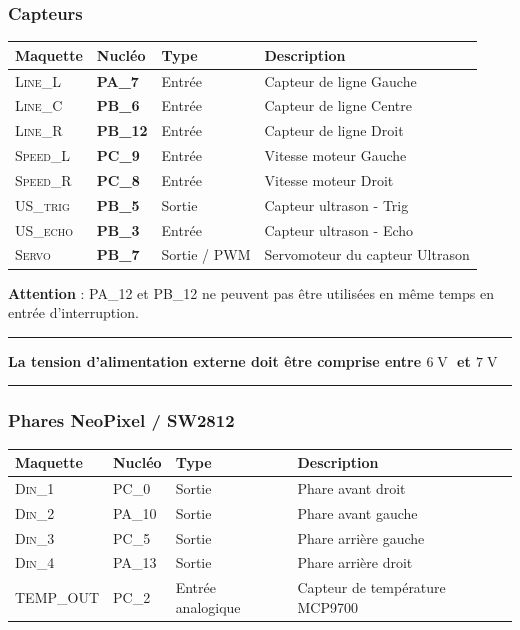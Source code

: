 \documentclass[a4paper,12pt,titlepage]{article} %
\begin{document}
\subsubsection{Capteurs}

\begin{center}
\begin{tabular}{|l|l|l|l|}
\hline 
Maquette & \textbf{Nucléo} & Type & Description \\ 
\hline 
\textsc{Line\_L} & \textbf{PA\_7} & Entrée & Capteur de ligne Gauche\\ 
\textsc{Line\_C} & \textbf{PB\_6} & Entrée & Capteur de ligne Centre\\ 
\textsc{Line\_R} & \textbf{PB\_12} & Entrée & Capteur de ligne Droit\\ 
\hline 
\textsc{Speed\_L} & \textbf{PC\_9} & Entrée & Vitesse moteur Gauche\\ 
\textsc{Speed\_R} & \textbf{PC\_8} & Entrée & Vitesse moteur Droit\\ 
\hline  
\textsc{US\_trig} & \textbf{PB\_5} & Sortie & Capteur ultrason - Trig\\ 
\textsc{US\_echo} & \textbf{PB\_3} & Entrée & Capteur ultrason - Echo\\ 
\textsc{Servo} & \textbf{PB\_7} & Sortie / PWM & Servomoteur du capteur Ultrason\\ 
\hline  
\end{tabular} 
\end{center}


\textbf{Attention} : PA\_12 et PB\_12 ne peuvent pas être utilisées en même temps en entrée d'interruption.

\noindent \rule{\linewidth}{1pt}

\textbf{\large La tension d'alimentation externe doit être comprise entre $6\operatorname{V}$ et $7\operatorname{V}$ }

\noindent \rule{\linewidth}{1pt}

\newpage
\subsubsection{Phares NeoPixel / SW2812}

\begin{center}
\begin{tabular}{|l|l|l|l|}
\hline 
Maquette & \textbf{Nucléo} & Type & Description \\ 
\hline 
\textsc{Din\_1} & PC\_0 & Sortie & Phare avant droit\\ 
\textsc{Din\_2} & PA\_10 & Sortie & Phare avant gauche\\ 
\textsc{Din\_3} & PC\_5 & Sortie & Phare arrière gauche\\ 
\textsc{Din\_4} & PA\_13 & Sortie & Phare arrière droit\\
\hline  
\textsc{TEMP\_OUT} & PC\_2 & Entrée analogique & Capteur de température MCP9700\\ 
\hline  
\end{tabular} 
\end{center}
\end{document}
